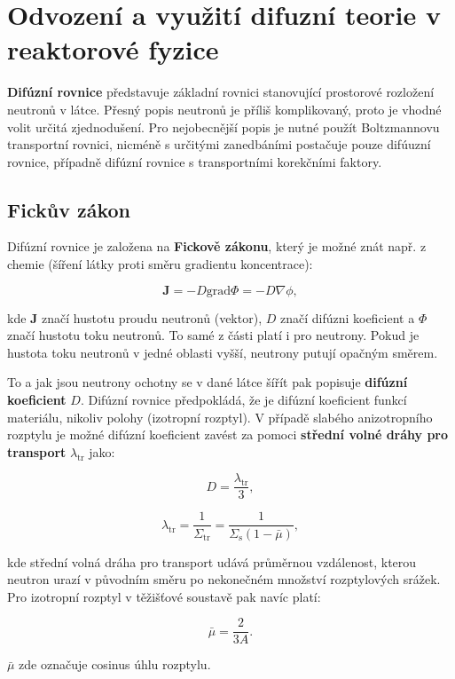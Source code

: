 \section[Difúzní teorie]{Odvození a využití difuzní teorie v reaktorové fyzice}

\textbf{Difúzní rovnice} představuje základní rovnici stanovující prostorové rozložení neutronů v látce. Přesný popis neutronů je příliš komplikovaný, proto je vhodné volit určitá zjednodušení. Pro nejobecnější popis je nutné použít Boltzmannovu transportní rovnici, nicméně s určitými zanedbáními postačuje pouze difúuzní rovnice, případně difúzní rovnice s transportními korekčními faktory.

\subsection{Fickův zákon}

Difúzní rovnice je založena na \textbf{Fickově zákonu}, který je možné znát např. z chemie (šíření látky proti směru gradientu koncentrace):

\begin{equation}
    \boxed{ \textbf{J} = - D \text{grad} \Phi = -D \nabla \phi, }
\end{equation}

kde $\textbf{J}$ značí hustotu proudu neutronů (vektor), $D$ značí difúzni koeficient a $\Phi$ značí hustotu toku neutronů. To samé z části platí i pro neutrony. Pokud je hustota toku neutronů v jedné oblasti vyšší, neutrony putují opačným směrem. 

To a jak jsou neutrony ochotny se v dané látce šířít pak popisuje \textbf{difúzní koeficient} $D$. Difúzní rovnice předpokládá, že je difúzní koeficient funkcí materiálu, nikoliv polohy (izotropní rozptyl). V případě slabého anizotropního rozptylu je možné difúzní koeficient zavést za pomoci \textbf{střední volné dráhy pro transport} $\lambda_\text{tr}$ jako:

$$ D = \dfrac{\lambda_\text{tr}}{3}, $$

$$ \lambda_\text{tr} = \dfrac{1}{\Sigma_\text{tr}} = \dfrac{1}{\Sigma_\text{s}(1-\bar{\mu})}, $$

kde střední volná dráha pro transport udává průměrnou vzdálenost, kterou neutron urazí v původním směru po nekonečném množství rozptylových srážek. Pro izotropní rozptyl v těžišťové soustavě pak navíc platí:

$$ \bar{\mu} = \dfrac{2}{3A}. $$

$\bar{\mu}$ zde označuje cosinus úhlu rozptylu.

